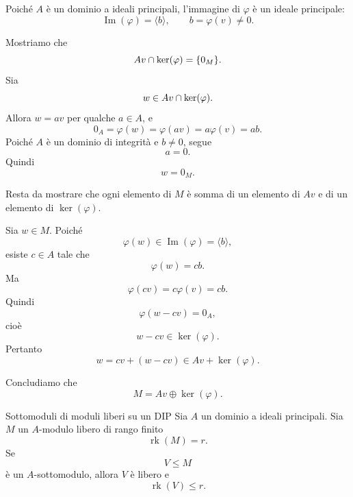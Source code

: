 \documentclass[a4paper]{article}
\begin{document}
\begin{radioactive}
\begin{snippetproof}{}
    Poiché \(A\) è un dominio a ideali principali, l'immagine di \(\varphi\) è un ideale principale:
    \[
        \operatorname{Im}(\varphi)=\langle b \rangle,
        \qquad
        b=\varphi(v)\neq 0.
    \]

    Mostriamo che
    \[
        Av\cap \ker(\varphi)=\{0_M\}.
    \]
    Sia
    \[
        w\in Av\cap \ker(\varphi).
    \]
    Allora \(w=av\) per qualche \(a\in A\), e
    \[
        0_A=\varphi(w)=\varphi(av)=a\varphi(v)=ab.
    \]
    Poiché \(A\) è un dominio di integrità e \(b\neq 0\), segue
    \[
        a=0.
    \]
    Quindi
    \[
        w=0_M.
    \]

    Resta da mostrare che ogni elemento di \(M\) è somma di un elemento di \(Av\) e di un elemento di \(\ker(\varphi)\).

    Sia \(w\in M\). Poiché
    \[
        \varphi(w)\in\operatorname{Im}(\varphi)=\langle b \rangle,
    \]
    esiste \(c\in A\) tale che
    \[
        \varphi(w)=cb.
    \]
    Ma
    \[
        \varphi(cv)=c\varphi(v)=cb.
    \]
    Quindi
    \[
        \varphi(w-cv)=0_A,
    \]
    cioè
    \[
        w-cv\in\ker(\varphi).
    \]
    Pertanto
    \[
        w=cv+(w-cv)\in Av+\ker(\varphi).
    \]

    Concludiamo che
    \[
        M=Av\oplus\ker(\varphi).
    \]
\end{snippetproof}
\end{radioactive}

\pagebreak

\begin{radioactive}
\begin{snippettheorem}{Sottomoduli di moduli liberi su un DIP}
    Sia \(A\) un dominio a ideali principali.
    Sia \(M\) un \(A\)-modulo libero di rango finito
    \[
        \operatorname{rk}(M)=r.
    \]
    Se
    \[
        V\leq M
    \]
    è un \(A\)-sottomodulo, allora \(V\) è libero e
    \[
        \operatorname{rk}(V)\leq r.
    \]
\end{snippettheorem}
\end{radioactive}
\end{document}
